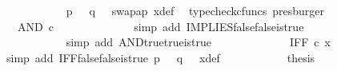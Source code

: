 \begin{isabellebody}
\ \ \ \ \ \ \ \ \ \ \isamarkupfalse%
\ {\isacartoucheopen}p\ {\isacharequal}{\kern0pt}\ {\isasymf}{\isacartoucheclose}\ {\isacartoucheopen}q\ {\isacharequal}{\kern0pt}\ {\isasymf}{\isacartoucheclose}\ swap{\isacharunderscore}{\kern0pt}ap\ x{\isacharunderscore}{\kern0pt}def\ \isamarkupfalse%
\ {\isacharparenleft}{\kern0pt}typecheck{\isacharunderscore}{\kern0pt}cfuncs{\isacharcomma}{\kern0pt}\ presburger{\isacharparenright}{\kern0pt}\isanewline
\ \ \ \ \ \ \ \ \isamarkupfalse%
\ \isamarkupfalse%
\ {\isachardoublequoteopen}{\isachardot}{\kern0pt}{\isachardot}{\kern0pt}{\isachardot}{\kern0pt}\ {\isacharequal}{\kern0pt}\ AND\ {\isasymcirc}\isactrlsub c\ {\isasymlangle}{\isasymt}{\isacharcomma}{\kern0pt}\ {\isasymt}{\isasymrangle}{\isachardoublequoteclose}\isanewline
\ \ \ \ \ \ \ \ \ \ \isamarkupfalse%
\ {\isacharparenleft}{\kern0pt}simp\ add{\isacharcolon}{\kern0pt}\ IMPLIES{\isacharunderscore}{\kern0pt}false{\isacharunderscore}{\kern0pt}false{\isacharunderscore}{\kern0pt}is{\isacharunderscore}{\kern0pt}true{\isacharparenright}{\kern0pt}\isanewline
\ \ \ \ \ \ \ \ \isamarkupfalse%
\ \isamarkupfalse%
\ {\isachardoublequoteopen}{\isachardot}{\kern0pt}{\isachardot}{\kern0pt}{\isachardot}{\kern0pt}\ {\isacharequal}{\kern0pt}\ {\isasymt}{\isachardoublequoteclose}\isanewline
\ \ \ \ \ \ \ \ \ \ \isamarkupfalse%
\ {\isacharparenleft}{\kern0pt}simp\ add{\isacharcolon}{\kern0pt}\ AND{\isacharunderscore}{\kern0pt}true{\isacharunderscore}{\kern0pt}true{\isacharunderscore}{\kern0pt}is{\isacharunderscore}{\kern0pt}true{\isacharparenright}{\kern0pt}\isanewline
\ \ \ \ \ \ \ \ \isamarkupfalse%
\ \isamarkupfalse%
\ {\isachardoublequoteopen}{\isachardot}{\kern0pt}{\isachardot}{\kern0pt}{\isachardot}{\kern0pt}\ {\isacharequal}{\kern0pt}\ IFF\ {\isasymcirc}\isactrlsub c\ x{\isachardoublequoteclose}\isanewline
\ \ \ \ \ \ \ \ \ \ \isamarkupfalse%
\ {\isacharparenleft}{\kern0pt}simp\ add{\isacharcolon}{\kern0pt}\ IFF{\isacharunderscore}{\kern0pt}false{\isacharunderscore}{\kern0pt}false{\isacharunderscore}{\kern0pt}is{\isacharunderscore}{\kern0pt}true\ {\isacartoucheopen}p\ {\isacharequal}{\kern0pt}\ {\isasymf}{\isacartoucheclose}\ {\isacartoucheopen}q\ {\isacharequal}{\kern0pt}\ {\isasymf}{\isacartoucheclose}\ x{\isacharunderscore}{\kern0pt}def{\isacharparenright}{\kern0pt}\isanewline
\ \ \ \ \ \ \ \ \isamarkupfalse%
\ \isamarkupfalse%
\ {\isacharquery}{\kern0pt}thesis\isanewline

\end{isabellebody}
